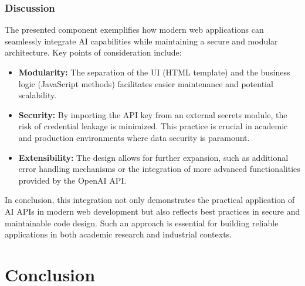 \subsubsection{Discussion}

The presented component exemplifies how modern web applications can seamlessly integrate AI capabilities while maintaining a secure and modular architecture. Key points of consideration include:
\begin{itemize}
    \item \textbf{Modularity:} The separation of the UI (HTML template) and the business logic (JavaScript methods) facilitates easier maintenance and potential scalability.
    \item \textbf{Security:} By importing the API key from an external secrets module, the risk of credential leakage is minimized. This practice is crucial in academic and production environments where data security is paramount.
    \item \textbf{Extensibility:} The design allows for further expansion, such as additional error handling mechanisms or the integration of more advanced functionalities provided by the OpenAI API.
\end{itemize}

In conclusion, this integration not only demonstrates the practical application of AI APIs in modern web development but also reflects best practices in secure and maintainable code design. Such an approach is essential for building reliable applications in both academic research and industrial contexts.


\section{Conclusion}









